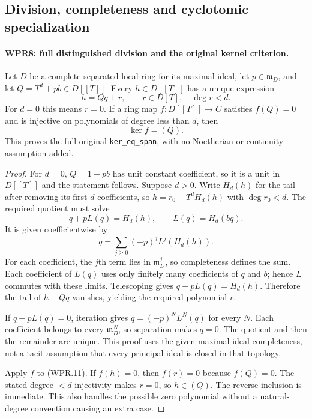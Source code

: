 \documentclass[11pt,a4paper]{article}
\numberwithin{equation}{section}
\theoremstyle{remark}\newtheorem{remark}[theorem]{Remark}
\begin{document}
\subsection{Division, completeness and cyclotomic specialization}

\paragraph{WPR8: full distinguished division and the original kernel criterion.}
\label{claim:WPR8}
Let $D$ be a complete separated local ring for its maximal ideal,
let $p\in\mathfrak m_D$, and let
$Q=T^d+pb\in D[[T]]$. Every $h\in D[[T]]$ has a unique
expression
\[
                     h=Qq+r,\qquad r\in D[T],\quad\deg r<d.
 \tag{WPR.11}
\]
For $d=0$ this means $r=0$. If a ring map $f:D[[T]]\to C$
satisfies $f(Q)=0$ and is injective on polynomials of degree
less than $d$, then
\[
                              \ker f=(Q).
 \tag{WPR.12}
\]
This proves the full original \texttt{ker\_\allowbreak eq\_\allowbreak span}, with no
Noetherian or continuity assumption added.

\begin{proof}
For $d=0$, $Q=1+pb$ has unit constant coefficient, so it is a
unit in $D[[T]]$ and the statement follows. Suppose $d>0$.
Write $H_d(h)$ for the tail after removing its first $d$
coefficients, so $h=r_0+T^dH_d(h)$ with $\deg r_0<d$.
The required quotient must solve
\[
       q+pL(q)=H_d(h),\qquad L(q)=H_d(bq).
\]
It is given coefficientwise by
\[
                       q=\sum_{j\geq0}(-p)^jL^j(H_d(h)).
\]
For each coefficient, the $j$th term lies in
$\mathfrak m_D^j$, so completeness defines the sum.
Each coefficient of $L(q)$ uses only finitely many coefficients
of $q$ and $b$; hence $L$ commutes with these limits.
Telescoping gives $q+pL(q)=H_d(h)$. Therefore the tail of
$h-Qq$ vanishes, yielding the required polynomial $r$.

If $q+pL(q)=0$, iteration gives
$q=(-p)^NL^N(q)$ for every $N$. Each coefficient belongs to
every $\mathfrak m_D^N$, so separation makes $q=0$.
The quotient and then the remainder are unique. This proof uses
the given maximal-ideal completeness, not a tacit assumption that
every principal ideal is closed in that topology.

Apply $f$ to (WPR.11). If $f(h)=0$, then $f(r)=0$ because
$f(Q)=0$. The stated degree-$<d$ injectivity makes $r=0$,
so $h\in(Q)$. The reverse inclusion is immediate. This also
handles the possible zero polynomial without a natural-degree
convention causing an extra case.
\end{proof}
\end{document}
